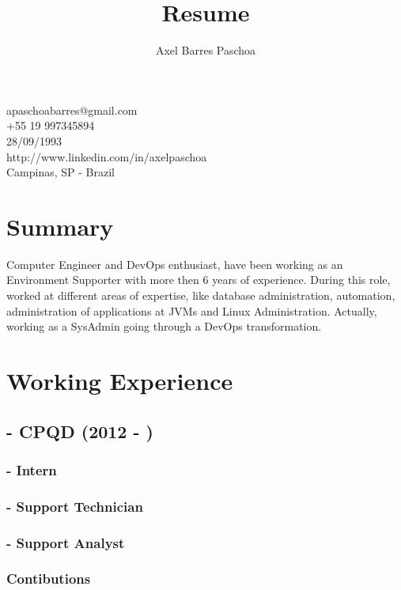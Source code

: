 \documentclass{article}
\makeatletter
\renewcommand{\maketitle}{

\begin{center}

{\huge\bfseries\theauthor}

apaschoabarres@gmail.com \\
+55 19 997345894 \\
28/09/1993 \\
http://www.linkedin.com/in/axelpaschoa \\
Campinas, SP - Brazil
\end{center}
}
\makeatother
\begin{document}
\title{Resume}
\author{Axel Barres Paschoa}

\maketitle

\section{Summary}

Computer Engineer and DevOps enthusiast, have been working as an Environment Supporter with more then 6 years of experience. During this role, worked at different areas of expertise, like database administration, automation, administration of applications at JVMs and Linux Administration. Actually, working as a SysAdmin going through a DevOps transformation.


\section{Working Experience}

\subsection{- CPQD (2012 - )}

\subsubsection{- Intern}

\subsubsection{- Support Technician}

\subsubsection{- Support Analyst \\}

\subsubsection{Contibutions \\}
\end{document}
